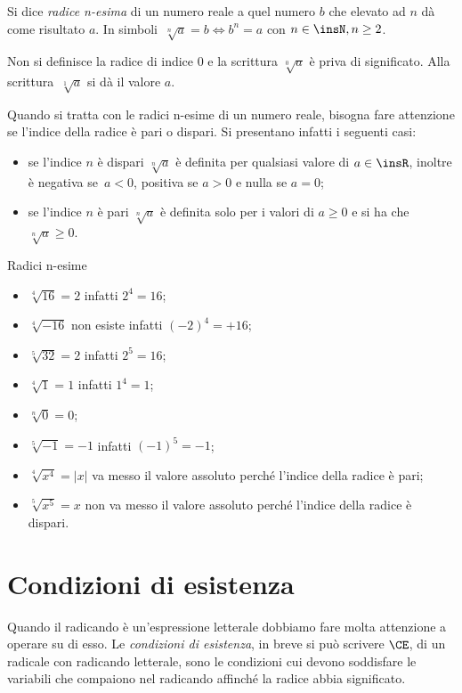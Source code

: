 \begin{definizione}
Si dice \emph{radice n-esima} di un numero reale a quel numero $b$ che elevato ad $n$ dà come risultato $a$.
In simboli~$\sqrt[n]a=b \Leftrightarrow b^n=a$ con $n\in \insN, n\ge 2$.

Non si definisce la radice di indice $0$ e la scrittura $\sqrt[0]a$ è priva di significato. Alla scrittura~$\sqrt[1]a$ si dà il valore $a$.
\end{definizione}
Quando si tratta con le radici n-esime di un numero reale, bisogna fare attenzione se l’indice della radice è pari o dispari. Si presentano infatti i seguenti casi:
\begin{itemize}
 \item se l’indice $n$ è dispari $\sqrt[n]a$ è definita per qualsiasi valore di $a\in \insR$, inoltre è negativa se~$a<0$, positiva se $a>0$ e nulla se $a=0$;
 \item se l’indice $n$ è pari $\sqrt[n]a$ è definita solo per i valori di $a\geq 0$ e si ha che $\sqrt[n]a\ge 0$.
\end{itemize}
\newpage
\begin{exrig}
\begin{esempio}
Radici n-esime
\begin{multicols}{2}
 \begin{itemize}
 \item $\sqrt[4]{16}=2$ infatti $2^4=16$;
 \item $\sqrt[4]{-16}$ non esiste infatti $(-2)^4=+16$;
 \item $\sqrt[5]{32}=2$ infatti $2^5=16$;
 \item $\sqrt[4]1=1$ infatti $1^4=1$;
 \item $\sqrt[n]0=0$;
 \item $\sqrt[5]{-1}=-1$ infatti $(-1)^5=-1$;
 \item $\sqrt[4]{x^4}=\left|x\right|$ va messo il valore assoluto perché l'indice della radice è pari;
 \item $\sqrt[5]{x^5}=x$ non va messo il valore assoluto perché l'indice della radice è dispari.
\end{itemize}
\end{multicols}
\end{esempio}
\end{exrig}

\ovalbox{\risolvii \ref{ese:2.1}, \ref{ese:2.2}, \ref{ese:2.3}, \ref{ese:2.4},\ref{ese:2.5}, \ref{ese:2.6},\ref{ese:2.7}, \ref{ese:2.8},\ref{ese:2.9}, \ref{ese:2.10}}

\section{Condizioni di esistenza}
Quando il radicando è un'espressione letterale dobbiamo fare molta attenzione a operare su di esso.
Le \emph{condizioni di esistenza}, in breve si può scrivere $\CE$, di un radicale con radicando letterale, sono le condizioni cui devono soddisfare le variabili che compaiono nel radicando affinché la radice abbia significato.

